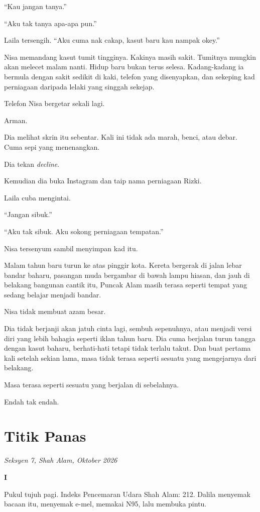 \documentclass[
  11pt,
  a5paper,
  openany,
  oneside]{book}
\begin{document}
``Kau jangan tanya.''

``Aku tak tanya apa-apa pun.''

Laila tersengih. ``Aku cuma nak cakap, kasut baru kau nampak okey.''

Nisa memandang kasut tumit tingginya. Kakinya masih sakit. Tumitnya
mungkin akan melecet malam nanti. Hidup baru bukan terus selesa.
Kadang-kadang ia bermula dengan sakit sedikit di kaki, telefon yang
disenyapkan, dan sekeping kad perniagaan daripada lelaki yang singgah
sekejap.

Telefon Nisa bergetar sekali lagi.

Arman.

Dia melihat skrin itu sebentar. Kali ini tidak ada marah, benci, atau
debar. Cuma sepi yang menenangkan.

Dia tekan \emph{decline}.

Kemudian dia buka Instagram dan taip nama perniagaan Rizki.

Laila cuba mengintai.

``Jangan sibuk.''

``Aku tak sibuk. Aku sokong perniagaan tempatan.''

Nisa tersenyum sambil menyimpan kad itu.

Malam tahun baru turun ke atas pinggir kota. Kereta bergerak di jalan
lebar bandar baharu, pasangan muda bergambar di bawah lampu hiasan, dan
jauh di belakang bangunan cantik itu, Puncak Alam masih terasa seperti
tempat yang sedang belajar menjadi bandar.

Nisa tidak membuat azam besar.

Dia tidak berjanji akan jatuh cinta lagi, sembuh sepenuhnya, atau
menjadi versi diri yang lebih bahagia seperti iklan tahun baru. Dia cuma
berjalan turun tangga dengan kasut baharu, berhati-hati tetapi tidak
terlalu takut. Dan buat pertama kali setelah sekian lama, masa tidak
terasa seperti sesuatu yang mengejarnya dari belakang.

Masa terasa seperti sesuatu yang berjalan di sebelahnya.

Endah tak endah.

\chapter{Titik Panas}\label{titik-panas}

\emph{Seksyen 7, Shah Alam, Oktober 2026}

\textbf{I}

Pukul tujuh pagi. Indeks Pencemaran Udara Shah Alam: 212. Dalila
menyemak bacaan itu, menyemak e-mel, memakai N95, lalu membuka pintu.
\end{document}
